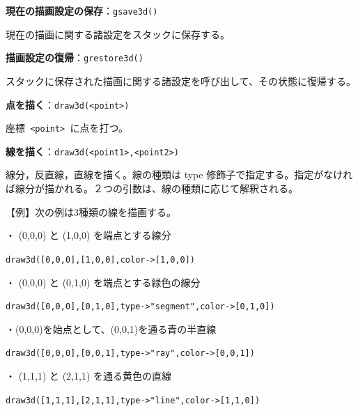 \documentclass[papersize,a4paper,12pt,uplatex]{jsarticle}
\begin{document}
\hypertarget{gsave3d}{}
\vspace{\baselineskip}
\noindent
{\bf 現在の描画設定の保存}：\verb|gsave3d()|

現在の描画に関する諸設定をスタックに保存する。

\hypertarget{grestore3d}{}
\vspace{\baselineskip}
\noindent
{\bf 描画設定の復帰}：\verb|grestore3d()|

スタックに保存された描画に関する諸設定を呼び出して、その状態に復帰する。

\hypertarget{draw3d}{}
\vspace{\baselineskip}
\noindent
{\bf 点を描く}：\verb|draw3d(<point>)|

座標\verb| <point> |に点を打つ。

\vspace{\baselineskip}
 

\vspace{\baselineskip}
\noindent
{\bf 線を描く}：\verb|draw3d(<point1>,<point2>)|

線分，反直線，直線を描く。線の種類は type  修飾子で指定する。指定がなければ線分が描かれる。２つの引数は、線の種類に応じて解釈される。

\vspace{\baselineskip}
 

\vspace{\baselineskip}
 

\vspace{\baselineskip}
\noindent
【例】次の例は3種類の線を描画する。

・ (0,0,0) と (1,0,0) を端点とする線分

\hspace{5mm} \verb|draw3d([0,0,0],[1,0,0],color->[1,0,0])| 

・ (0,0,0) と (0,1,0) を端点とする緑色の線分

\hspace{5mm} \verb|draw3d([0,0,0],[0,1,0],type->"segment",color->[0,1,0])| 

・(0,0,0)を始点として、(0,0,1)を通る青の半直線

\hspace{5mm} \verb|draw3d([0,0,0],[0,0,1],type->"ray",color->[0,0,1])|

・ (1,1,1) と (2,1,1) を通る黄色の直線

\hspace{5mm} \verb|draw3d([1,1,1],[2,1,1],type->"line",color->[1,1,0])| 
\end{document}
